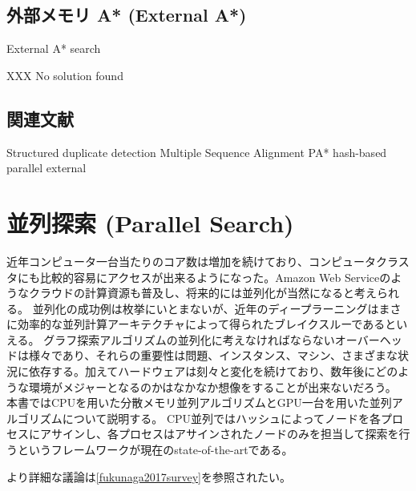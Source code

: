 \documentclass[10pt]{book}
\begin{document}
\subsection{外部メモリ A* (External A*)}
\label{sec:external-astar}
\cite{edelkamp2004external}


\begin{algorithm}
\caption{External A* search}
\label{alg:external-astar}
	
	XXX
	\Return No solution found
\end{algorithm}

\subsection{関連文献}
Structured duplicate detection \cite{}
Multiple Sequence Alignment
PA* hash-based parallel external


\section{並列探索 (Parallel Search)}
\label{sec:parallel-search}

近年コンピュータ一台当たりのコア数は増加を続けており、コンピュータクラスタにも比較的容易にアクセスが出来るようになった。Amazon Web Serviceのようなクラウドの計算資源も普及し、将来的には並列化が当然になると考えられる。
並列化の成功例は枚挙にいとまないが、近年のディープラーニングはまさに効率的な並列計算アーキテクチャによって得られたブレイクスルーであるといえる。
グラフ探索アルゴリズムの並列化に考えなければならないオーバーヘッドは様々であり、それらの重要性は問題、インスタンス、マシン、さまざまな状況に依存する。加えてハードウェアは刻々と変化を続けており、数年後にどのような環境がメジャーとなるのかはなかなか想像をすることが出来ないだろう。
本書ではCPUを用いた分散メモリ並列アルゴリズムとGPU一台を用いた並列アルゴリズムについて説明する。
CPU並列ではハッシュによってノードを各プロセスにアサインし、各プロセスはアサインされたノードのみを担当して探索を行うというフレームワークが現在のstate-of-the-artである。


より詳細な議論は\ref{fukunaga2017survey}を参照されたい。
\end{document}

